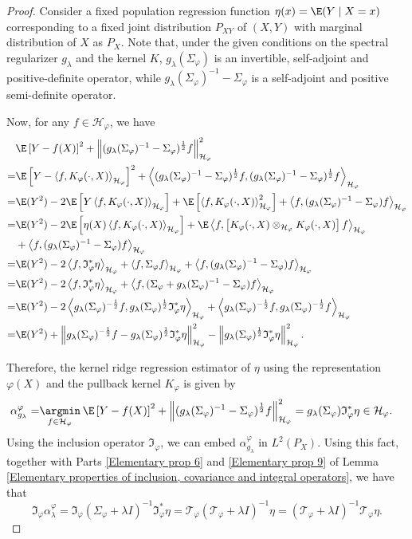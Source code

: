 \documentclass{article} %
\newcommand{\I}{\mathfrak{I}}
\newcommand{\rep}{\varphi}
\newcommand{\Hrep}{\mathcal{H}_{\varphi}}
\newcommand{\Srep}{\Sigma_{\rep}}
\newcommand{\Sreplambdainv}{(\Srep+\lambda I)^{-1}}
\newcommand{\Trep}{\mathcal{T}_{\rep}}
\newcommand{\Treplambdainv}{(\Trep+\lambda I)^{-1}}
\newcommand{\Irep}{\I_{\rep}}
\newcommand{\Irepad}{\Irep^{*}}
\newcommand{\gl}{g_{\lambda}}
\newcommand{\norm}[1]{\left\|#1\right\|}
\newcommand{\inprod}[1]{\left \langle #1 \right\rangle}
\newcommand{\LPtwo}{L^{2}(P_{X})}
\theoremstyle{plain}
\begin{document}
\begin{proof}
    Consider a fixed population regression function $\eta(x) = \E(Y \mid X = x)$ corresponding to a fixed joint distribution $P_{XY}$ of $(X, Y)$ with marginal distribution of $X$ as $P_X$. Note that, under the given conditions on the spectral regularizer $\gl$ and the kernel $K$, $\gl(\Srep)$ is an invertible, self-adjoint and positive-definite operator, while $\gl(\Srep)^{-1} - \Srep$ is a self-adjoint and positive semi-definite operator.
    
    Now, for any $f \in \Hrep$, we have
    \[
    \begin{aligned}
        &\E\left[Y-f(X)\right]^{2} + \norm{(\gl(\Srep)^{-1} - \Srep)^{\frac{1}{2}}f}_{\Hrep}^{2}\\
        =& \E\left[Y-\inprod{f,K_{\rep}(\cdot,X)}_{\Hrep}\right]^{2} +\inprod{(\gl(\Srep)^{-1} - \Srep)^{\frac{1}{2}}f,(\gl(\Srep)^{-1} - \Srep)^{\frac{1}{2}}f}_{\Hrep}\\
        =&\E(Y^{2}) - 2\E\left[Y\inprod{f,K_{\rep}(\cdot,X)}_{\Hrep}\right] + \E\left[\inprod{f,K_{\rep}(\cdot,X)}_{\Hrep}^{2}\right] + \inprod{f,(\gl(\Srep)^{-1} - \Srep)f}_{\Hrep}\\
        =&\E(Y^{2}) - 2\E\left[\eta(X)\inprod{f,K_{\rep}(\cdot,X)}_{\Hrep}\right] + \E\inprod{f,\left[K_{\rep}(\cdot,X) \otimes_{\Hrep}K_{\rep}(\cdot,X)\right] f}_{\Hrep} \\
        &+ \inprod{f,(\gl(\Srep)^{-1} - \Srep)f}_{\Hrep}\\
        =&\E(Y^{2}) - 2\inprod{f,\I_{\rep}^{*}\eta}_{\Hrep} + \inprod{f,\Srep f}_{\Hrep} + \inprod{f,(\gl(\Srep)^{-1} - \Srep)f}_{\Hrep}\\
        =&\E(Y^{2}) - 2\inprod{f,\I_{\rep}^{*}\eta}_{\Hrep} + \inprod{f,(\Srep + \gl(\Srep)^{-1} - \Srep)f}_{\Hrep}\\
        =&\E(Y^{2}) - 2\inprod{\gl(\Srep)^{-\frac{1}{2}}f,\gl(\Srep)^{\frac{1}{2}}\I_{\rep}^{*}\eta}_{\Hrep} + \inprod{\gl(\Srep)^{-\frac{1}{2}}f,\gl(\Srep)^{-\frac{1}{2}}f}_{\Hrep}\\
        =&\E(Y^{2}) + \norm{\gl(\Srep)^{-\frac{1}{2}}f - \gl(\Srep)^{\frac{1}{2}}\I_{\rep}^{*}\eta}_{\Hrep}^{2} - \norm{\gl(\Srep)^{\frac{1}{2}}\I_{\rep}^{*}\eta}_{\Hrep}^{2}.
    \end{aligned}
    \]

Therefore, the kernel ridge regression estimator of $\eta$ using the representation $\rep(X)$ and the pullback kernel $K_{\rep}$ is given by 
\[
\begin{aligned}
    \alpha_{\gl}^{\rep} = & \underset{f \in \Hrep}{\argmin} \hspace{2pt} \E\left[Y-f(X)\right]^{2} + \norm{(\gl(\Srep)^{-1} - \Srep)^{\frac{1}{2}}f}_{\Hrep}^{2}
    = \gl(\Srep)\I_{\rep}^{*}\eta \in \Hrep.
\end{aligned}
\]
Using the inclusion operator $\I_{\rep}$, we can embed $\alpha_{\gl}^{\rep}$ in $\LPtwo$. Using this fact, together with Parts \ref{Elementary prop 6} and \ref{Elementary prop 9} of Lemma \ref{Elementary properties of inclusion, covariance and integral operators}, we have that
\[\Irep \alpha_{\lambda}^{\rep} = \Irep \Sreplambdainv \Irepad \eta =\Trep \Treplambdainv \eta =   \Treplambdainv \Trep \eta.\]


\end{proof}
\end{document}
